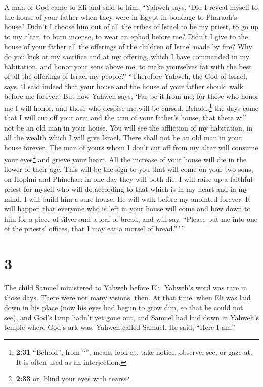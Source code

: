  A man of God came to Eli and said to him, ``Yahweh says,
`Did I reveal myself to the house of your father when they were in Egypt
in bondage to Pharaoh's house?  Didn't I choose him out
of all the tribes of Israel to be my priest, to go up to my altar, to
burn incense, to wear an ephod before me? Didn't I give to the house of
your father all the offerings of the children of Israel made by fire?
 Why do you kick at my sacrifice and at my offering,
which I have commanded in my habitation, and honor your sons above me,
to make yourselves fat with the best of all the offerings of Israel my
people?'  ``Therefore Yahweh, the God of Israel, says, `I
said indeed that your house and the house of your father should walk
before me forever.' But now Yahweh says, `Far be it from me; for those
who honor me I will honor, and those who despise me will be cursed.
 Behold,\footnote{\textbf{2:31} ``Behold'', from
  ``'', means look at, take notice, observe, see, or gaze
  at. It is often used as an interjection.} the days come that I will
cut off your arm and the arm of your father's house, that there will not
be an old man in your house.  You will see the affliction
of my habitation, in all the wealth which I will give Israel. There
shall not be an old man in your house forever.  The man
of yours whom I don't cut off from my altar will consume your
eyes\footnote{\textbf{2:33} or, blind your eyes with tears} and grieve
your heart. All the increase of your house will die in the flower of
their age.  This will be the sign to you that will come
on your two sons, on Hophni and Phinehas: in one day they will both die.
 I will raise up a faithful priest for myself who will do
according to that which is in my heart and in my mind. I will build him
a sure house. He will walk before my anointed forever. 
It will happen that everyone who is left in your house will come and bow
down to him for a piece of silver and a loaf of bread, and will say,
``Please put me into one of the priests' offices, that I may eat a
morsel of bread.''\,'\,''

\hypertarget{section-2}{%
\section{3}\label{section-2}}

 The child Samuel ministered to Yahweh before Eli.
Yahweh's word was rare in those days. There were not many visions, then.
 At that time, when Eli was laid down in his place (now
his eyes had begun to grow dim, so that he could not see),
 and God's lamp hadn't yet gone out, and Samuel had laid
down in Yahweh's temple where God's ark was,  Yahweh
called Samuel. He said, ``Here I am.''

